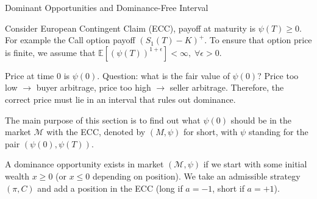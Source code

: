 \documentclass{beamer}
\begin{document}
\begin{frame}{Dominant Opportunities and Dominance-Free Interval}

    {\footnotesize \footnotesize
    \par Consider European Contingent Claim (ECC), payoff at maturity is $\psi(T) \geq 0$. For example the Call option payoff $(S_1(T) - K)^+$.
    To ensure that option price is finite, we assume that  $\mathbb{E}[(\psi(T))^{1+\epsilon}] < \infty, \;\forall \epsilon > 0$.
    \vspace{1em}
    \par Price at time 0 is $\psi(0)$. Question: what is the fair value of $\psi(0)$?
     Price too low $\rightarrow$ buyer arbitrage, price too high $\rightarrow$ seller arbitrage. 
    Therefore, the correct price must lie in an interval that rules out dominance.
    \vspace{1em}
    \par The main purpose of this section is to find out what $\psi(0)$ should be in the market $\mathcal{M}$ with the ECC,  
    denoted by $(M, \psi)$ for short, with $\psi$ standing for the pair $(\psi(0), \psi(T))$.
    \vspace{1em}
     \par A dominance opportunity exists in market $(\mathcal{M}, \psi)$ if  we
     start with some initial wealth $x \geq 0$ (or $x \leq 0$ depending on position). We take an admissible strategy $(\pi, C)$ and 
     add a position in the ECC (long if $a = -1$, short if $a = +1$).
    } 
\end{frame} 
\end{document}
